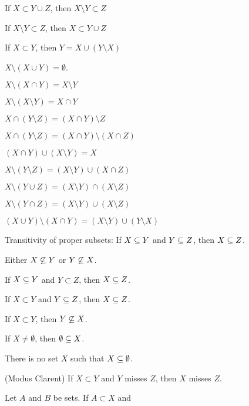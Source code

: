\begin{thm}
\item\label{xboole1:43} If $X\subset Y \cup Z$, then $X \setminus Y \subset Z$
\item\label{xboole1:44} If $X\setminus Y\subset Z$, then $X \subset Y \cup Z$
\item\label{xboole1:45} If $X \subset Y$, then $Y = X \cup (Y \setminus X)$
\item\label{xboole1:46} $X \setminus (X \cup Y) = \emptyset$.
\item\label{xboole1:47} $X \setminus (X \cap Y) = X \setminus Y$
\item\label{xboole1:48} $X \setminus (X \setminus Y) = X \cap Y$
\item\label{xboole1:49} $X \cap (Y \setminus Z) = (X \cap Y) \setminus Z$
\item\label{xboole1:50} $X \cap (Y \setminus Z) = (X \cap Y) \setminus (X \cap Z)$
\item\label{xboole1:51} $(X \cap Y) \cup (X \setminus Y) = X$
\item\label{xboole1:52} $X \setminus (Y \setminus Z) = (X \setminus Y) \cup (X \cap Z)$
\item\label{xboole1:53} $X \setminus (Y \cup Z) = (X \setminus Y) \cap (X \setminus Z)$
\item\label{xboole1:54} $X \setminus (Y \cap Z) = (X \setminus Y) \cup (X \setminus Z)$
\item\label{xboole1:55} $(X \cup Y) \setminus (X \cap Y) = (X \setminus Y) \cup (Y \setminus X)$
\item\label{xboole1:56} Transitivity of proper subsets: If
  $X\properSubset Y$ and $Y\properSubset Z$, then $X\properSubset Z$.
\item\label{xboole1:57} Either $X\not\properSubset Y$ or
  $Y\not\properSubset X$.
\item\label{xboole1:58} If
  $X\properSubset Y$ and $Y\subset Z$, then $X\properSubset Z$.
\item\label{xboole1:59}  If
  $X\subset Y$ and $Y\properSubset Z$, then $X\properSubset Z$.
\item\label{xboole1:60} If $X\subset Y$, then $Y\not\properSubset X$.
\item\label{xboole1:61} If $X\neq\emptyset$, then
  $\emptyset\properSubset X$.
\item\label{xboole1:62} There is no set $X$ such that $X\properSubset\emptyset$.
\item\label{xboole1:63} (Modus Clarent) If $X\subset Y$ and $Y$ misses
  $Z$, then $X$ misses $Z$.
\item\label{xboole1:64} Let $A$ and $B$ be sets. If $A\subset X$ and

\end{thm}

